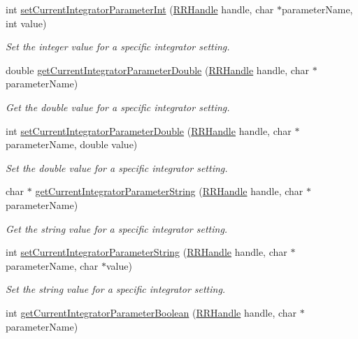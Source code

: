 \begin{DoxyCompactItemize}
int \hyperlink{group__simopts_ga4b5b2be1b4a77b8225f5c7d9a1e0bdfb}{set\+Current\+Integrator\+Parameter\+Int} (\hyperlink{rrc__types_8h_a1d68f0592372208fa5a5f2799ea4b3ae}{R\+R\+Handle} handle, char $\ast$parameter\+Name, int value)
\begin{DoxyCompactList}\small\item\em Set the integer value for a specific integrator setting. \end{DoxyCompactList}\item 
double \hyperlink{group__simopts_gad859b0cb1724ab3aeee81230c2da272a}{get\+Current\+Integrator\+Parameter\+Double} (\hyperlink{rrc__types_8h_a1d68f0592372208fa5a5f2799ea4b3ae}{R\+R\+Handle} handle, char $\ast$parameter\+Name)
\begin{DoxyCompactList}\small\item\em Get the double value for a specific integrator setting. \end{DoxyCompactList}\item 
int \hyperlink{group__simopts_ga90d69322c437f56d551c14445b57bb5a}{set\+Current\+Integrator\+Parameter\+Double} (\hyperlink{rrc__types_8h_a1d68f0592372208fa5a5f2799ea4b3ae}{R\+R\+Handle} handle, char $\ast$parameter\+Name, double value)
\begin{DoxyCompactList}\small\item\em Set the double value for a specific integrator setting. \end{DoxyCompactList}\item 
char $\ast$ \hyperlink{group__simopts_ga11536f253e0b43f8a282bf3bdfaf1328}{get\+Current\+Integrator\+Parameter\+String} (\hyperlink{rrc__types_8h_a1d68f0592372208fa5a5f2799ea4b3ae}{R\+R\+Handle} handle, char $\ast$parameter\+Name)
\begin{DoxyCompactList}\small\item\em Get the string value for a specific integrator setting. \end{DoxyCompactList}\item 
int \hyperlink{group__simopts_ga7b901ff654788259368fc15c01fe53a6}{set\+Current\+Integrator\+Parameter\+String} (\hyperlink{rrc__types_8h_a1d68f0592372208fa5a5f2799ea4b3ae}{R\+R\+Handle} handle, char $\ast$parameter\+Name, char $\ast$value)
\begin{DoxyCompactList}\small\item\em Set the string value for a specific integrator setting. \end{DoxyCompactList}\item 
int \hyperlink{group__simopts_gab06f6ef3c9c6b57a2806132b1906a52e}{get\+Current\+Integrator\+Parameter\+Boolean} (\hyperlink{rrc__types_8h_a1d68f0592372208fa5a5f2799ea4b3ae}{R\+R\+Handle} handle, char $\ast$parameter\+Name)

\end{DoxyCompactItemize}
